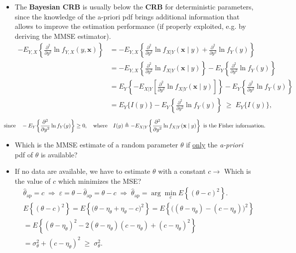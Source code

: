 \begin{itemize}
\item The \textbf{Bayesian CRB} is usually below the \textbf{CRB} for deterministic parameters, since the knowledge of the a-priori pdf brings additional information that allows to improve the estimation performance (if properly exploited, e.g. by deriving the MMSE estimator).
\begin{align*}
- E_{Y,X}\!\left\{
   \frac{\partial^{2}}{\partial y^{2}}
   \ln f_{Y,X}(y,\mathbf{x})
 \right\}
&= - E_{Y,X}\!\left\{
      \frac{\partial^{2}}{\partial y^{2}}
      \ln f_{X|Y}(\mathbf{x}\mid y)
      + \frac{\partial^{2}}{\partial y^{2}}
        \ln f_Y(y)
   \right\} \\[4pt]
&= - E_{Y,X}\!\left\{
      \frac{\partial^{2}}{\partial y^{2}}
      \ln f_{X|Y}(\mathbf{x}\mid y)
   \right\}
   - E_Y\!\left\{
      \frac{\partial^{2}}{\partial y^{2}}
      \ln f_Y(y)
   \right\} \\[4pt]
&= E_Y\!\left\{
      - E_{X|Y}\!\left[
        \frac{\partial^{2}}{\partial y^{2}}
        \ln f_{X|Y}(\mathbf{x}\mid y)
      \right]
   \right\}
   - E_Y\!\left\{
      \frac{\partial^{2}}{\partial y^{2}}
      \ln f_Y(y)
   \right\} \\[4pt]
&= E_Y\!\{ I(y) \}
   - E_Y\!\left\{
      \frac{\partial^{2}}{\partial y^{2}}
      \ln f_Y(y)
   \right\}
 \;\ge\; E_Y\!\{ I(y) \},
\end{align*}
\[\hspace{-2em}
\text{since}\quad
- E_Y\!\left\{
  \frac{\partial^{2}}{\partial y^{2}}
  \ln f_Y(y)
\right\} \ge 0,
\quad\text{where}\quad
I(y) \triangleq
- E_{X|Y}\!\left\{
  \frac{\partial^{2}}{\partial y^{2}}
  \ln f_{X|Y}(\mathbf{x}\mid y)
\right\}\text{ is the Fisher information.}
\]
\item Which is the MMSE estimate of a random parameter \(\theta\) if \underline{only} the \textit{a-priori} pdf of \(\theta\) is available?
\item If no data are available, we have to estimate \(\theta\) with a constant \(c\rightarrow\) Which is the value of \(c\) which minimizes the MSE?
\begin{align*}
&\hat{\theta}_{\text{ap}} = c
 \;\Rightarrow\;
\varepsilon = \theta - \hat{\theta}_{\text{ap}} = \theta - c
 \;\Rightarrow\;
\hat{\theta}_{\text{ap}} = \arg\min_{c} E\!\left\{(\theta - c)^{2}\right\}. \\[6pt]
&E\!\left\{(\theta - c)^{2}\right\}
= E\!\left\{\bigl(\theta - \eta_{\theta} + \eta_{\theta} - c\bigr)^{2}\right\}
 = E\!\left\{\bigl((\theta - \eta_{\theta}) - (c - \eta_{\theta})\bigr)^{2}\right\} \\[2pt]
&= E\!\left\{(\theta - \eta_{\theta})^{2}
          - 2(\theta - \eta_{\theta})(c - \eta_{\theta})
          + (c - \eta_{\theta})^{2}\right\} \\[2pt]
&= \sigma_{\theta}^{2} + (c - \eta_{\theta})^{2}
 \;\ge\; \sigma_{\theta}^{2}.
\end{align*}


\end{itemize}
